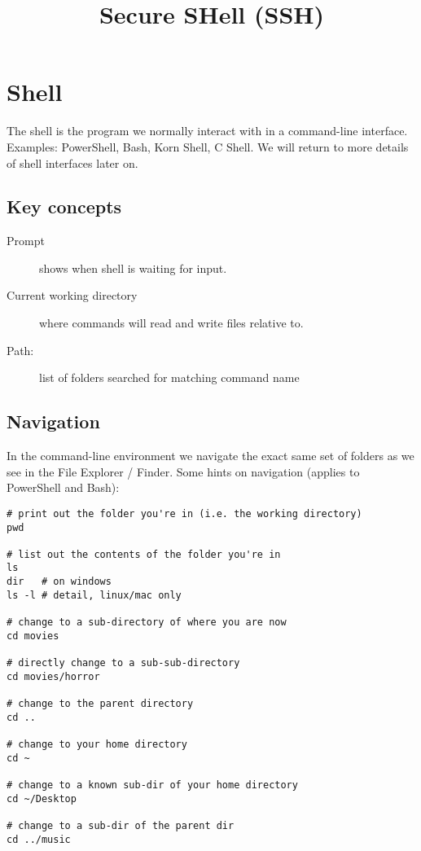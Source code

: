 \documentclass[slides]{pgnotes}
\title{Secure SHell (SSH)}
\begin{document}
\maketitle

\tableofcontents

\section{Shell}

The shell is the program we normally interact with in a command-line interface.
Examples: PowerShell, Bash, Korn Shell, C Shell.
We will return to more details of shell interfaces later on. 

\subsection{Key concepts}

\begin{description}
\item[Prompt] shows when shell is waiting for input.
\item[Current working directory] where commands will read and write files relative to.
\item[Path:] list of folders searched for matching command name
\end{description}

\subsection{Navigation}

In the command-line environment we navigate the exact same set of folders as we see in the File Explorer / Finder.
Some hints on navigation (applies to PowerShell and Bash):

\begin{verbatim}
# print out the folder you're in (i.e. the working directory)
pwd

# list out the contents of the folder you're in
ls
dir   # on windows
ls -l # detail, linux/mac only

# change to a sub-directory of where you are now
cd movies

# directly change to a sub-sub-directory
cd movies/horror

# change to the parent directory
cd ..

# change to your home directory
cd ~

# change to a known sub-dir of your home directory
cd ~/Desktop

# change to a sub-dir of the parent dir
cd ../music
\end{verbatim}
\end{document}
